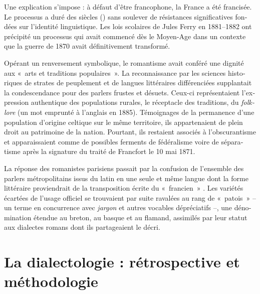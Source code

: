 \documentclass[french,output=paper,colorlinks,citecolor=brown]{../langscibook}
\begin{document}
\begin{otherlanguage}{french}
Une explication s’impose : à défaut d’être francophone, la France a été francisée. Le processus a duré des siècles (\citealt{Brunot1905, BoyerGardy2001, KremnitzBroudic2013}) sans soulever de résistances significatives fondées sur l’identité linguistique. Les lois scolaires de Jules Ferry en 1881--1882 ont précipité un processus qui avait commencé dès le Moyen-Age dans un contexte que la guerre de 1870 avait définitivement transformé. 

Opérant un renversement symbolique, le romantisme avait conféré une dignité aux «~arts et traditions populaires~». La reconnaissance par les sciences historiques de strates de peuplement et de langues littéraires différenciées supplantait la condescendance pour des parlers frustes et désuets. Ceux-ci représentaient l’expression authentique des populations rurales, le réceptacle des traditions, du \textit{folklore} (un mot emprunté à l’anglais en 1885). Témoignages de la permanence d’une population d’origine celtique sur le même territoire, ils appartenaient de plein droit au patrimoine de la nation. Pourtant, ils restaient associés à l’obscurantisme et apparaissaient comme de possibles ferments de fédéralisme voire de séparatisme après la signature du traité de Francfort le 10 mai 1871. 

La réponse des romanistes parisiens passait par la confusion de l’ensemble des parlers métropolitains issus du latin en une seule et même langue dont la forme littéraire proviendrait de la transposition écrite du «~francien~» \citep{AurouxEtAl1996}. Les variétés écartées de l’usage officiel se trouvaient par suite ravalées au rang de «~patois~» – un terme en concurrence avec \textit{jargon} et autres vocables dépréciatifs –, une dénomination étendue au breton, au basque et au flamand, assimilés par leur statut aux dialectes romans dont ils partageaient le décri.

\section{La dialectologie : rétrospective et méthodologie}
 

\end{otherlanguage}
\end{document}
